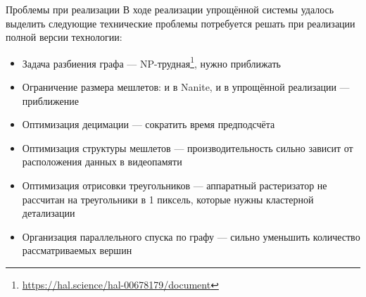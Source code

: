 \begin{frame}{Проблемы при реализации}
    В ходе реализации упрощённой системы удалось выделить следующие технические проблемы потребуется решать при реализации полной версии технологии:
    \begin{itemize}
        \item Задача разбиения графа --- NP-трудная\footnote{\url{https://hal.science/hal-00678179/document}}, нужно приближать
        \item Ограничение размера мешлетов:
        и в Nanite, и в упрощённой реализации --- приближение
        \item Оптимизация децимации --- сократить время предподсчёта
        \item Оптимизация структуры мешлетов
        --- производительность сильно зависит от расположения данных в видеопамяти
        \item Оптимизация отрисовки треугольников
        --- аппаратный растеризатор не рассчитан на треугольники в 1 пиксель, которые нужны кластерной детализации
        \item Организация параллельного спуска по графу --- сильно уменьшить количество рассматриваемых вершин
    \end{itemize}
\end{frame}
